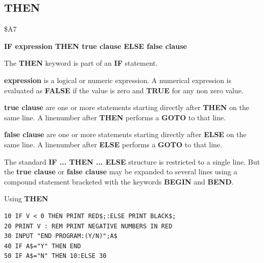 \subsection{THEN}
\begin{description}[leftmargin=2cm,style=nextline]
\item [Token:] \$A7
\item [Format:] {\bf IF expression THEN true clause ELSE false clause}
\item [Usage:] The {\bf THEN} keyword is part of an {\bf IF}
               statement.

               {\bf expression} is a logical or numeric expression.
               A numerical expression is evaluated as {\bf FALSE}
               if the value is zero and {\bf TRUE} for any non zero
               value.

               {\bf true clause} are one or more statements starting
               directly after {\bf THEN} on the same line.
               A linenumber after {\bf THEN} performs a
               {\bf GOTO} to that line.

               {\bf false clause} are one or more statements starting
               directly after {\bf ELSE} on the same line.
               A linenumber after {\bf ELSE} performs a
               {\bf GOTO} to that line.

\item [Remarks:]
               The standard {\bf IF ... THEN ... ELSE} structure
               is restricted to a single line. But the {\bf true clause}
               or {\bf false clause} may be expanded to several lines
               using a compound statement bracketed with the keywords
               {\bf BEGIN} and {\bf BEND}.
\item [Example:]
                Using {\bf THEN}
\begin{tcolorbox}[colback=black,coltext=white]
\verbatimfont{\codefont}
\begin{verbatim}
10 IF V < 0 THEN PRINT RED$;:ELSE PRINT BLACK$;
20 PRINT V : REM PRINT NEGATIVE NUMBERS IN RED
30 INPUT "END PROGRAM:(Y/N)";A$
40 IF A$="Y" THEN END
50 IF A$="N" THEN 10:ELSE 30

\end{verbatim}
\end{tcolorbox}
\end{description}


\newpage
